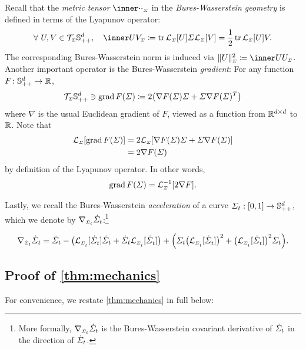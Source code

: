 Recall that the \emph{metric tensor} $\innerBW[\cdot][\cdot][\Sigma]$ in the \emph{Bures-Wasserstein geometry} \citep{takatsu2010wasserstein} is defined in terms of the Lyapunov operator: 
\begin{align}
\label{eq:BW-tensor}
\forall\ U, V\in \tspace, \quad \innerBW[U][V][\Sigma] \defeq \tr\lyap[\Sigma][U]\Sigma\lyap[\Sigma][V] = \frac{1}{2}\tr \lyap[\Sigma][U]V.
\end{align}The corresponding Bures-Wasserstein norm is induced via $\normBWsq[U][\Sigma] \defeq \innerBW[U][U][\Sigma]$.
Another important operator is the Bures-Wasserstein \emph{gradient}: For any function $F \colon \mathbb{S}_{++}^d \to \mathbb{R}$, 
\begin{equation}
\label{eq:gradBW-def}
\tspace\ni \gradBW F(\Sigma) \defeq 2 \parens*{ \nabla F(\Sigma)\Sigma + \Sigma \nabla F(\Sigma)^T }
\end{equation}where $\nabla$ is the usual Euclidean gradient of $F$, viewed as a function from $\mathbb{R}^{d\times d}$ to $\mathbb{R}$. Note that
\begin{align}
\lyap[\Sigma][\gradBW F(\Sigma)] &= 2 \lyap[\Sigma][\nabla F(\Sigma)\Sigma + \Sigma\nabla F(\Sigma)] \\
&= 2 \nabla F(\Sigma)
\end{align}by definition of the Lyapunov operator. In other words,
\begin{align}
\label{eq:gradBW-lyapinv}
\gradBW F(\Sigma) = \lyapinv.
\end{align}


Lastly, we recall the Bures-Wasserstein \emph{acceleration} of a curve $\Sigma_{t}: [0,1] \to \mathbb{S}_{++}^d$, which we denote by $\nabla_{\scriptscriptstyle\dot{\Sigma}_{t}}\dot{\Sigma}_{t}$:\footnote{More formally, $\nabla_{\scriptscriptstyle\dot{\Sigma}_{t}}\dot{\Sigma}_{t}$ is the Bures-Wasserstein covariant derivative of $\dot{\Sigma}_{t}$ in the direction of $\dot{\Sigma}_{t}$.}

\begin{align}
\label{eq:coderBW}
\coder = \ddSigcurve -  \parens*{  \lyap \dSigcurve + \dSigcurve\lyap } + \parens*{ \Sigcurve \parens*{\lyap}^2 + \parens*{\lyap}^2 \Sigcurve}.
\end{align}





\subsection{Proof of \cref{thm:mechanics}}
\label{app:proofmechanics}


For convenience, we restate \cref{thm:mechanics} in full below: 
\mechanics*


